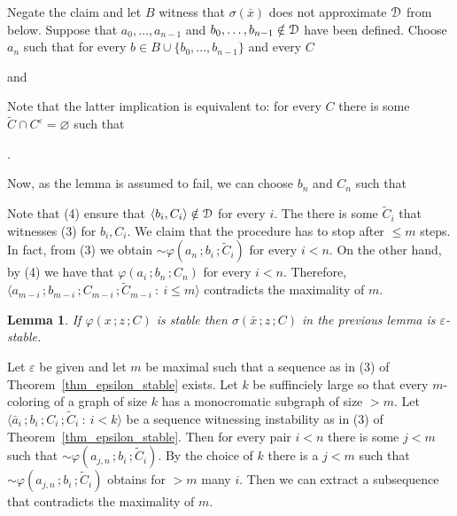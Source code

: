 \documentclass{amsproc}
\makeatletter
\newcounter{thm}
\theoremstyle{mio}
\newtheorem{lemma}[thm]{Lemma}\tcolorboxenvironment{lemma}{mythm}
\providecommand{\proofNameStyle}{\bfseries}
\renewenvironment{proof}[1][\proofname]{\par
  \pushQED{\qed}%
  \normalfont%
  \trivlist
  \item[\hskip\labelsep
        \proofNameStyle
    #1\@addpunct{.}]\ignorespaces
}{%
  \popQED\endtrivlist\@endpefalse
}
\makeatother
\begin{document}
\begin{proof}
  Negate the claim and let $B$ witness that $\sigma(\bar x)$ does not approximate ${\EuScript D}$ from below.
  Suppose that $a_0,\dots,a_{n-1}$ and $b_0,\dots,b_{n-1}\notin{\EuScript D}$ have been defined.
  Choose $a_n$ such that for every $b\in B\cup\{b_0,\dots,b_{n-1}\}$ and every $C$

  \quad and

  
  Note that the latter implication is equivalent to: for every $C$ there is some  $\tilde C\cap C^\varepsilon=\varnothing$ such that 
  
  .%

  Now, as the lemma is assumed to fail, we can choose $b_n$ and $C_n$ such that


  Note that (4) ensure that $\langle b_i,C_i\rangle\notin{\EuScript D}$ for every $i$.
  The there is some $\tilde C_i$ that witnesses (3) for $b_i,C_i$.
  We claim that the procedure has to stop after $\le m$ steps. 
  In fact, from (3) we obtain ${\sim}\varphi(a_n\,;b_i\,;\tilde C_i)$ for every $i<n$.
  On the other hand, by (4) we have that $\varphi(a_i\,;b_n\,;C_n)$ for every $i<n$.
  Therefore, $\langle a_{m-i}\,;b_{m-i}\,;C_{m-i}\,;\tilde C_{m-i}\ :\ i\le m\rangle$ contradicts the maximality of $m$.
\end{proof}

\begin{lemma}
  If $\varphi(x\,;z\,;C)$ is stable then $\sigma(\bar x\,;z\,;C)$ in the previous lemma is $\varepsilon$-stable.
\end{lemma}

\begin{proof}
  Let $\varepsilon$ be given and let $m$ be maximal such that a sequence as in (3) of Theorem~\ref{thm_epsilon_stable} exists.
  Let $k$ be suffinciely large so that every $m$-coloring of a graph of size $k$ has a monocromatic subgraph of size $>m$.
  Let $\langle \bar a_i\,;b_i\,;C_i\,;\tilde C_i\ :\ i<k\rangle$ be a sequence witnessing instability as in (3) of Theorem~\ref{thm_epsilon_stable}.
  Then for every pair $i<n$ there is some $j<m$ such that ${\sim}\varphi(a_{j,n}\,;b_i\,;\tilde C_i)$.
  By the choice of $k$ there is a $j<m$ such that ${\sim}\varphi(a_{j,n}\,;b_i\,;\tilde C_i)$ obtains for $>m$ many $i$.
  Then we can extract a subsequence that contradicts the maximality of $m$.
\end{proof}
\end{document}
